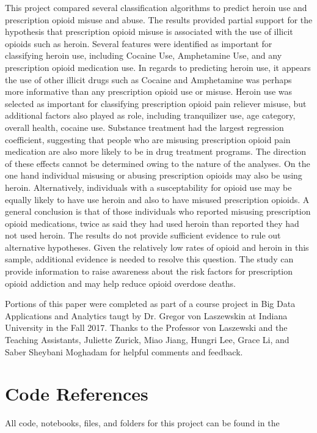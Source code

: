 \documentclass[sigconf]{acmart}
\begin{document}
This project compared several classification algorithms to predict heroin use 
and prescription opioid misuse and abuse. The results provided partial support
for the hypothesis that prescription opioid misuse is associated with the use
of illicit opioids such as heroin. Several features were identified as 
important for classifying heroin use, including Cocaine Use, Amphetamine Use, 
and any prescription opioid medication use. In regards to predicting heroin
use, it appears the use of other illicit drugs such as Cocaine and Amphetamine 
was perhaps more informative than any prescription opioid use or misuse. Heroin 
use was selected as important for classifying prescription opioid pain reliever 
misuse, but additional factors also played as role, including tranquilizer use,
age category, overall health, cocaine use. Substance treatment had the largest
regression coefficient, suggesting that people who are misusing prescription
opioid pain medication are also more likely to be in drug treatment programs. 
The direction of these effects cannot be determined owing to the nature of the 
analyses. On the one hand individual misusing or abusing prescription opioids 
may also be using heroin. Alternatively, individuals with a susceptability for 
opioid use may be equally likely to have use heroin and also to have misused 
prescription opioids. A general conclusion is that of those individuals who 
reported misusing prescription opioid medications, twice as said they had used
heroin than reported they had not used heroin. The results do not provide 
sufficient evidence to rule out alternative hypotheses. Given the relatively 
low rates of opioid and heroin in this sample, additional evidence is needed to 
resolve this question. The study can provide information to raise awareness 
about the risk factors for prescription opioid addiction and may help reduce 
opioid overdose deaths. 




\begin{acks}

Portions of this paper were completed as part of a course project in Big Data 
Applications and Analytics taugt by Dr. Gregor von Laszewskin at Indiana 
University in the Fall 2017. Thanks to the Professor von Laszewski and the
Teaching Assistants, Juliette Zurick, Miao Jiang, Hungri Lee, Grace Li, and 
Saber Sheybani Moghadam for helpful comments and feedback.

\end{acks}

 


\appendix

\section{Code References}
All code, notebooks, files, and folders for this project can be found in the



%
\end{document}
